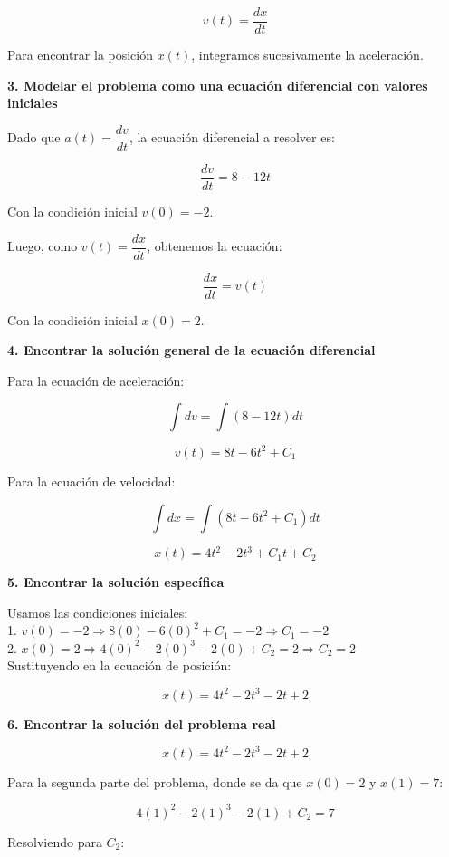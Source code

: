 \documentclass[answers]{exam}
\begin{document}
\[
	v(t) = \frac{dx}{dt}
\]

Para encontrar la posición \( x(t) \), integramos sucesivamente la aceleración.

\vspace{0.3cm}
\textbf{3. Modelar el problema como una ecuación diferencial con valores iniciales}

Dado que \( a(t) = \dfrac{dv}{dt} \), la ecuación diferencial a resolver es:

\[
	\frac{dv}{dt} = 8 - 12t
\]

Con la condición inicial \( v(0) = -2 \).

Luego, como \( v(t) = \dfrac{dx}{dt} \), obtenemos la ecuación:

\[
	\frac{dx}{dt} = v(t)
\]

Con la condición inicial \( x(0) = 2 \).

\vspace{0.3cm}
\textbf{4. Encontrar la solución general de la ecuación diferencial}

Para la ecuación de aceleración:

\[
	\int dv = \int (8 - 12t) dt
\]

\[
	v(t) = 8t - 6t^2 + C_1
\]

Para la ecuación de velocidad:

\[
	\int dx = \int (8t - 6t^2 + C_1) dt
\]

\[
	x(t) = 4t^2 - 2t^3 + C_1 t + C_2
\]

\newpage
\textbf{5. Encontrar la solución específica}

Usamos las condiciones iniciales:\\

1. \( v(0) = -2 \Rightarrow 8(0) - 6(0)^2 + C_1 = -2 \Rightarrow C_1 = -2 \)\\

2. \( x(0) = 2 \Rightarrow 4(0)^2 - 2(0)^3 -2(0) + C_2 = 2 \Rightarrow C_2 = 2 \)\\

Sustituyendo en la ecuación de posición:

\[
	x(t) = 4t^2 - 2t^3 - 2t + 2
\]


\textbf{6. Encontrar la solución del problema real}

\[
	x(t) = 4t^2 - 2t^3 - 2t + 2
\]

Para la segunda parte del problema, donde se da que \( x(0) = 2 \) y \( x(1) = 7 \):

\[
	4(1)^2 - 2(1)^3 - 2(1) + C_2 = 7
\]

Resolviendo para \( C_2 \):
\end{document}
